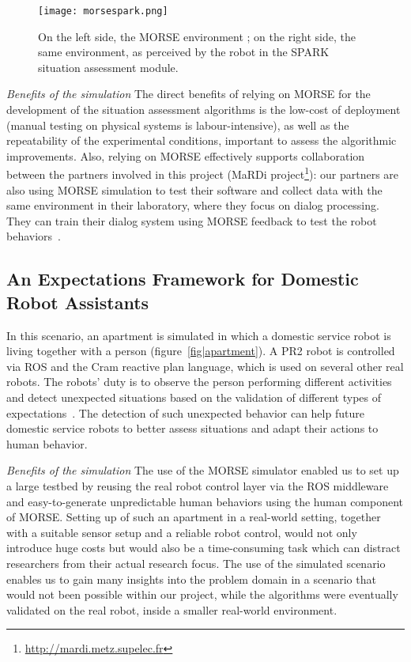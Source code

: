 \documentclass{llncs}
\begin{document}
\begin{figure}[t]
      \centering
      \texttt{[image: morsespark.png]}
      \caption{On the left side, the MORSE environment ; on the right side, the same
      environment, as perceived by the robot in the SPARK situation assessment
      module.}
      \label{fig|spark}
\end{figure}

\emph{Benefits of the simulation} The direct benefits of relying on MORSE for
the development of the situation assessment algorithms is the low-cost of
deployment (manual testing on physical systems is labour-intensive), as well as
the repeatability of the experimental conditions, important to assess the
algorithmic improvements.  Also, relying on MORSE effectively supports
collaboration between the partners involved in this project (MaRDi
project\footnote{\url{http://mardi.metz.supelec.fr}}): our partners are also
using MORSE simulation to test their software and collect data with the same
environment in their laboratory, where they focus on dialog processing. They can
train their dialog system using MORSE feedback to test the robot behaviors~\cite{simparmardi2014}.

\subsection{An Expectations Framework for Domestic Robot Assistants}
\label{sc:expectations}

In this scenario, an apartment is simulated in which a domestic service robot is
living together with a person (figure~\ref{fig|apartment}).  A PR2 robot is
controlled via ROS and the {\sc Cram} reactive plan language, which is used on
several other real robots. The robots' duty is to observe the person performing
different activities and detect unexpected situations based on the validation of
different types of expectations~\cite{Karg2013}.  The detection of such
unexpected behavior can help future domestic service robots to better assess
situations and adapt their actions to human behavior.

\emph{Benefits of the simulation} The use of the MORSE simulator enabled us to
set up a large testbed by reusing the real robot control layer via the ROS
middleware and easy-to-generate unpredictable human behaviors using the human
component of MORSE. Setting up of such an apartment in a real-world setting,
together with a suitable sensor setup and a reliable robot control, would not
only introduce huge costs but would also be a time-consuming task which can
distract researchers from their actual research focus. The use of the simulated
scenario enables us to gain many insights into the problem domain in a scenario
that would not been possible within our project, while the algorithms were
eventually validated on the real robot, inside a smaller real-world environment.
\end{document}
